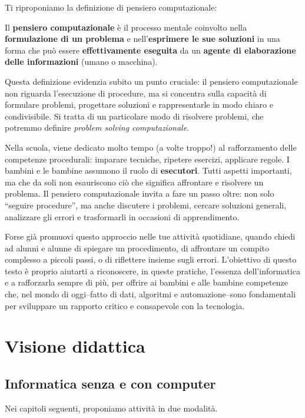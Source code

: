 Ti riproponiamo la definizione di pensiero computazionale:


Il \textbf{pensiero computazionale} è il processo mentale coinvolto nella \textbf{formulazione di un problema} e nell'\textbf{esprimere le sue soluzioni} in una forma che può essere \textbf{effettivamente eseguita} da un \textbf{agente di elaborazione delle informazioni} (umano o macchina).


Questa definizione evidenzia subito un punto cruciale: il pensiero computazionale non riguarda l'esecuzione di procedure, ma si concentra sulla capacità di formulare problemi, progettare soluzioni e rappresentarle in modo chiaro e condivisibile. Si tratta di un particolare modo di risolvere problemi, che potremmo definire \emph{problem solving computazionale}.

Nella scuola, viene dedicato molto tempo (a volte troppo!) al  rafforzamento delle competenze procedurali: imparare tecniche, ripetere esercizi, applicare regole. I bambini e le bambine assumono il ruolo di \textbf{esecutori}. Tutti aspetti importanti, ma che da soli non esauriscono ciò che significa affrontare e risolvere un problema. Il pensiero computazionale invita a fare un passo oltre: non solo ``seguire procedure'', ma anche discutere i problemi, cercare soluzioni generali, analizzare gli errori e trasformarli in occasioni di apprendimento.

Forse già promuovi questo approccio nelle tue attività quotidiane, quando chiedi ad alunni e alunne di spiegare un procedimento, di affrontare un compito complesso a piccoli passi, o di riflettere insieme sugli errori. L'obiettivo di questo testo è proprio aiutarti a riconoscere, in queste pratiche, l'essenza dell'informatica e a rafforzarla sempre di più, per offrire ai bambini e alle bambine competenze che, nel mondo di oggi--fatto di dati, algoritmi e automazione--sono fondamentali per sviluppare un rapporto critico e consapevole con la tecnologia.

\section{Visione didattica }\label{visione-didattica}

\subsection{Informatica senza e con computer }\label{informatica-senza-e-con-computer}

Nei capitoli seguenti, proponiamo attività in due modalità.

